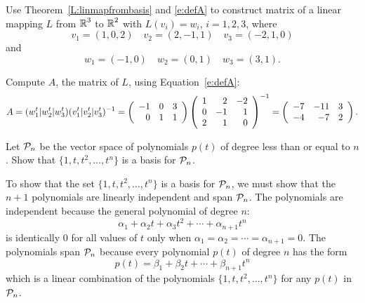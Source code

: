 \documentclass{ximera}
\begin{document}
\EXER

\TEXER

\begin{exercise} \label{c7.2.1}
Use Theorem~\ref{L:linmapfrombasis} and \eqref{e:defA} to 
construct matrix of a linear mapping $L$ from $\mbox{$\Bbb{R}$}^3$ to $\mbox{$\Bbb{R}$}^2$ with $L(v_i)=w_i$, $i=1,2,3$, where
\[
v_1=(1,0,2)\quad v_2=(2,-1,1) \quad v_3=(-2,1,0)
\]
and
\[
w_1=(-1,0) \quad w_2=(0,1) \quad w_3=(3,1).
\]

\begin{solution}

\soln
Compute $A$, the matrix of $L$, using Equation~\eqref{e:defA}:
\[ A = (w_1^t|w_2^t|w_3^t)(v_1^t|v_2^t|v_3^t)^{-1} =
\left(\begin{array}{rrr} -1 & 0 & 3 \\ 0 & 1 & 1 \end{array}\right)
\left(\begin{array}{rrr} 1 & 2 & -2 \\ 0 & -1 & 1 \\ 2 & 1 & 0\end{array}\right)^{-1} =
\left(\begin{array}{rrr} -7 & -11 & 3 \\ -4 & -7 & 2
\end{array}\right). \]

\end{solution}
\end{exercise}

\begin{exercise}  \label{c7.2.2}
Let ${\cal P}_n$ be the vector space of polynomials $p(t)$ of
degree less than or equal to $n$.  Show that $\{1,t,t^2,\ldots,t^n\}$ is a
basis for ${\cal P}_n$.

\begin{solution}

To show that the set $\{1,t,t^2,\dots,t^n\}$ is a basis for
${\cal P}_n$, we must show that the $n + 1$ polynomials are
linearly independent and span ${\cal P}_n$.  The polynomials are
independent because the general polynomial of degree $n$:
\[
\alpha_1 + \alpha_2t + \alpha_3t^2 + \cdots + \alpha_{n+1}t^n
\]
is identically $0$ for all values of $t$ only when $\alpha_1 =
\alpha_2 = \cdots = \alpha_{n + 1} = 0$.  The polynomials span
${\cal P}_n$ because every polynomial $p(t)$ of degree $n$ has
the form
\[ p(t) = \beta_1 + \beta_2t + \cdots + \beta_{n + 1}t^n \]
which is a linear combination of the polynomials
$\{1,t,t^2,\dots,t^n\}$ for any $p(t)$ in ${\cal P}_n$.

\end{solution}
\end{exercise}
\end{document}
